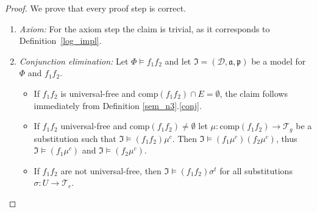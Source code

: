 \begin{proof}

We prove that every proof step is correct.
\begin{enumerate}
 \item \emph{Axiom:} For the axiom step the claim is trivial, as it corresponds to Definition~\ref{log_impl}.
 \item \emph{Conjunction elimination:}
 Let $\Phi\models f_1 f_2 $ and let  $\mathfrak{I}=(\mathcal{D},\mathfrak{a,p})$ be a model for $\Phi$ and $f_1 f_2$. 
 \begin{itemize}
 \item If $f_1 f_2$ is universal-free and $\text{comp}(f_1f_2)\cap E=\emptyset$, the claim follows immediately 
 from Definition  \ref{sem_n3}.\ref{conj}. 
 
 \item If $f_1f_2$ universal-free and $\text{comp}(f_1f_2)\neq \emptyset$ let $\mu:\text{comp}(f_1f_2)\rightarrow \mathcal{T}_g$ be a substitution such that
 $\mathfrak{I}\models (f_1f_2)\mu^c$. Then $\mathfrak{I}\models (f_1\mu^c) (f_2\mu^c)$, thus  $\mathfrak{I}\models (f_1\mu^c)$ and 
 $\mathfrak{I}\models (f_2\mu^c)$.
 \item If $f_1f_2$ are not universal-free, then $\mathfrak{I}\models (f_1f_2)\sigma^t$ for all substitutions $\sigma:U\rightarrow \mathcal{T}_e$. 
 

\end{itemize}
\end{enumerate}
\end{proof}
